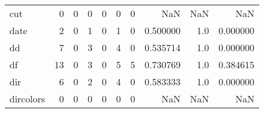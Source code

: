 \begin{tabular}{lrrrrrrrrr}
cut       &                                       0 &                                                  0 &                                                  0 &                                                  0 &                                                  0 &                                                  0 &                                                NaN &                                    NaN &                                  NaN \\
date      &                                       2 &                                                  0 &                                                  1 &                                                  0 &                                                  1 &                                                  0 &                                           0.500000 &                                    1.0 &                             0.000000 \\
dd        &                                       7 &                                                  0 &                                                  3 &                                                  0 &                                                  4 &                                                  0 &                                           0.535714 &                                    1.0 &                             0.000000 \\
df        &                                      13 &                                                  0 &                                                  3 &                                                  0 &                                                  5 &                                                  5 &                                           0.730769 &                                    1.0 &                             0.384615 \\
dir       &                                       6 &                                                  0 &                                                  2 &                                                  0 &                                                  4 &                                                  0 &                                           0.583333 &                                    1.0 &                             0.000000 \\
dircolors &                                       0 &                                                  0 &                                                  0 &                                                  0 &                                                  0 &                                                  0 &                                                NaN &                                    NaN &                                  NaN \\

\end{tabular}
